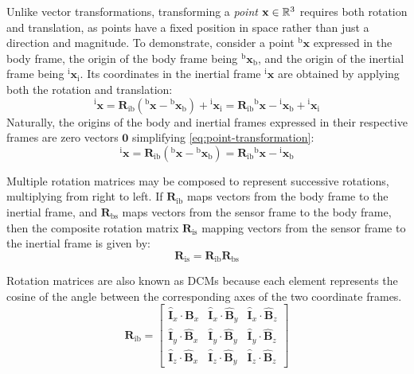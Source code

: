 Unlike vector transformations, transforming a \emph{point} \(\mathbf{x} \in \mathbb{R}^3\) requires both rotation and translation, as points have a fixed position in space rather than just a direction and magnitude.
To demonstrate, consider a point \({}^{\text{b}}\mathbf{x}\) expressed in the body frame, the origin of the body frame being \({}^{\text{b}}\mathbf{x}_{\text{b}}\), and the origin of the inertial frame being \({}^{\text{i}}\mathbf{x}_{\text{i}}\). 
Its coordinates in the inertial frame \({}^{\text{i}}\mathbf{x}\) are obtained by applying both the rotation and translation:
\begin{equation}
    {}^{\text{i}}\mathbf{x} = \mathbf{R}_{\text{ib}} \left( {}^{\text{b}}\mathbf{x} - {}^{\text{b}}\mathbf{x}_{\text{b}} \right) + {}^{\text{i}}\mathbf{x}_{\text{i}} = \mathbf{R}_{\text{ib}} {}^{\text{b}}\mathbf{x} - {}^{\text{i}}\mathbf{x}_{\text{b}} + {}^{\text{i}}\mathbf{x}_{\text{i}} 
\label{eq:point-transformation}
\end{equation}
Naturally, the origins of the body and inertial frames expressed in their respective frames are zero vectors \(\mathbf{0}\) simplifying \cref{eq:point-transformation}:
\begin{equation}
    {}^{\text{i}}\mathbf{x} = \mathbf{R}_{\text{ib}} \left( {}^{\text{b}}\mathbf{x} - {}^{\text{b}}\mathbf{x}_{\text{b}} \right) = \mathbf{R}_{\text{ib}} {}^{\text{b}}\mathbf{x} - {}^{\text{i}}\mathbf{x}_{\text{b}} 
\label{eq:point-transformation-simplified}
\end{equation}

Multiple rotation matrices may be composed to represent successive rotations, multiplying from right to left.
If \(\mathbf{R}_{\text{ib}}\) maps vectors from the body frame to the inertial frame, and \(\mathbf{R}_{\text{bs}}\) maps vectors from the sensor frame to the body frame, then the composite rotation matrix \(\mathbf{R}_{\text{is}}\) mapping vectors from the sensor frame to the inertial frame is given by:
\begin{equation}
\mathbf{R}_{\text{is}} = \mathbf{R}_{\text{ib}} \mathbf{R}_{\text{bs}}
\end{equation}

Rotation matrices are also known as \ac{DCM}s because each element represents the cosine of the angle between the corresponding axes of the two coordinate frames.
\begin{equation}
    \mathbf{R}_{\text{ib}} = 
    \begin{bmatrix}
        \hat{\mathbf{I}}_x \cdot \hat{\mathbf{B}}_x & \hat{\mathbf{I}}_x \cdot \hat{\mathbf{B}}_y & \hat{\mathbf{I}}_x \cdot \hat{\mathbf{B}}_z \\
        \hat{\mathbf{I}}_y \cdot \hat{\mathbf{B}}_x & \hat{\mathbf{I}}_y \cdot \hat{\mathbf{B}}_y & \hat{\mathbf{I}}_y \cdot \hat{\mathbf{B}}_z \\
        \hat{\mathbf{I}}_z \cdot \hat{\mathbf{B}}_x & \hat{\mathbf{I}}_z \cdot \hat{\mathbf{B}}_y & \hat{\mathbf{I}}_z \cdot \hat{\mathbf{B}}_z
    \end{bmatrix}
\label{eq:DCM-dot-prod}
\end{equation}

